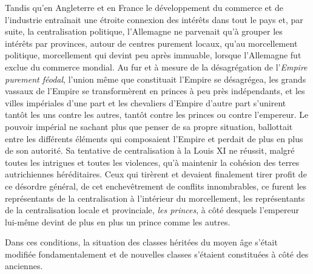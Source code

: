 \documentclass[french,twoside]{book} %
\begin{document}
Tandis qu’en Angleterre et en France le développement du commerce et de l’industrie entraînait une étroite connexion des intérêts dans tout le pays et, par suite, la centralisation politique, l’Allemagne ne parvenait qu’à grouper les intérêts par provinces, autour de centres purement locaux, qu’au morcellement politique, morcellement qui devint peu après immuable, lorsque l’Allemagne fut exclue du commerce mondial. Au fur et à mesure de la désagrégation de l’\emph{Empire purement féodal}, l’union même que constituait l’Empire se désagrégea, les grands vassaux de l’Empire se transformèrent en princes à peu près indépendants, et les villes impériales d’une part et les chevaliers d’Empire d’autre part s’unirent tantôt les uns contre les autres, tantôt contre les princes ou contre l’empereur. Le pouvoir impérial ne sachant plus que penser de sa propre situation, ballottait entre les différents éléments qui composaient l’Empire et perdait de plus en plus de son autorité. Sa tentative de centralisation à la Louis XI ne réussit, malgré toutes les intrigues et toutes les violences, qu’à maintenir la cohésion des terres autrichiennes héréditaires. Ceux qui tirèrent et devaient finalement tirer profit de ce désordre général, de cet enchevêtrement de conflits innombrables, ce furent les représentants de la centralisation à l’intérieur du morcellement, les représentants de la centralisation locale et provinciale, \emph{les princes}, à côté desquels l’empereur lui-même devint de plus en plus un prince comme les autres.\par
Dans ces conditions, la situation des classes héritées du moyen âge s’était modifiée fondamentalement et de nouvelles classes s’étaient constituées à côté des anciennes.\par
\end{document}
